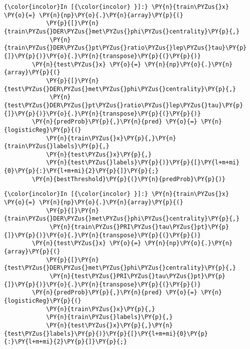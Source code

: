     \begin{Verbatim}[commandchars=\\\{\}]
{\color{incolor}In [{\color{incolor} }]:} \PY{n}{train\PYZus{}x} \PY{o}{=} \PY{n}{np}\PY{o}{.}\PY{n}{array}\PY{p}{(}
            \PY{p}{[}\PY{n}{train\PYZus{}DER\PYZus{}met\PYZus{}phi\PYZus{}centrality}\PY{p}{,}
             \PY{n}{train\PYZus{}DER\PYZus{}pt\PYZus{}ratio\PYZus{}lep\PYZus{}tau}\PY{p}{]}\PY{p}{)}\PY{o}{.}\PY{n}{transpose}\PY{p}{(}\PY{p}{)}
        \PY{n}{test\PYZus{}x} \PY{o}{=} \PY{n}{np}\PY{o}{.}\PY{n}{array}\PY{p}{(}
            \PY{p}{[}\PY{n}{test\PYZus{}DER\PYZus{}met\PYZus{}phi\PYZus{}centrality}\PY{p}{,}
             \PY{n}{test\PYZus{}DER\PYZus{}pt\PYZus{}ratio\PYZus{}lep\PYZus{}tau}\PY{p}{]}\PY{p}{)}\PY{o}{.}\PY{n}{transpose}\PY{p}{(}\PY{p}{)}
        \PY{n}{predProb}\PY{p}{,}\PY{n}{pred} \PY{o}{=} \PY{n}{logisticReg}\PY{p}{(}
            \PY{n}{train\PYZus{}x}\PY{p}{,}\PY{n}{train\PYZus{}labels}\PY{p}{,}
            \PY{n}{test\PYZus{}x}\PY{p}{,}
            \PY{n}{test\PYZus{}labels}\PY{p}{)}\PY{p}{[}\PY{l+m+mi}{0}\PY{p}{:}\PY{l+m+mi}{2}\PY{p}{]}\PY{p}{;}
        \PY{n}{bestThreshold}\PY{p}{(}\PY{n}{predProb}\PY{p}{)}
\end{Verbatim}

    \begin{Verbatim}[commandchars=\\\{\}]
{\color{incolor}In [{\color{incolor} }]:} \PY{n}{train\PYZus{}x} \PY{o}{=} \PY{n}{np}\PY{o}{.}\PY{n}{array}\PY{p}{(}
            \PY{p}{[}\PY{n}{train\PYZus{}DER\PYZus{}met\PYZus{}phi\PYZus{}centrality}\PY{p}{,}
             \PY{n}{train\PYZus{}PRI\PYZus{}tau\PYZus{}pt}\PY{p}{]}\PY{p}{)}\PY{o}{.}\PY{n}{transpose}\PY{p}{(}\PY{p}{)}
        \PY{n}{test\PYZus{}x} \PY{o}{=} \PY{n}{np}\PY{o}{.}\PY{n}{array}\PY{p}{(}
            \PY{p}{[}\PY{n}{test\PYZus{}DER\PYZus{}met\PYZus{}phi\PYZus{}centrality}\PY{p}{,}
             \PY{n}{test\PYZus{}PRI\PYZus{}tau\PYZus{}pt}\PY{p}{]}\PY{p}{)}\PY{o}{.}\PY{n}{transpose}\PY{p}{(}\PY{p}{)}
        \PY{n}{predProb}\PY{p}{,}\PY{n}{pred} \PY{o}{=} \PY{n}{logisticReg}\PY{p}{(}
            \PY{n}{train\PYZus{}x}\PY{p}{,}
            \PY{n}{train\PYZus{}labels}\PY{p}{,}
            \PY{n}{test\PYZus{}x}\PY{p}{,}\PY{n}{test\PYZus{}labels}\PY{p}{)}\PY{p}{[}\PY{l+m+mi}{0}\PY{p}{:}\PY{l+m+mi}{2}\PY{p}{]}\PY{p}{;}
\end{Verbatim}